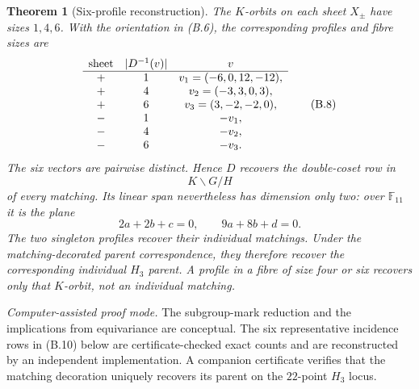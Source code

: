 \documentclass[11pt]{article}
\newtheorem{theorem}{Theorem}[section]
\theoremstyle{definition}
\theoremstyle{remark}
\newcommand{\F}{\mathbb{F}}
\begin{document}
\begin{theorem}[Six-profile reconstruction]
\label{thm:six-profile-reconstruction}
The \(K\)-orbits on each sheet \(X_\pm\) have sizes \(1,4,6\).
With the orientation in (B.6), the corresponding profiles and fibre
sizes are
\[
\begin{array}{c@{\quad}c@{\quad}c}
\text{sheet}& |D^{-1}(v)|&v\\ \hline
+&1&v_1=(-6,0,12,-12),\\
+&4&v_2=(-3,3,0,3),\\
+&6&v_3=(3,-2,-2,0),\\
-&1&-v_1,\\
-&4&-v_2,\\
-&6&-v_3.
\end{array}                                                \tag{B.8}
\]
The six vectors are pairwise distinct.  Hence \(D\) recovers the
double-coset row in
\[
 K\backslash G/H
\]
of every matching.  Its linear span nevertheless has dimension only
two: over \(\F_{11}\) it is the plane
\[
 2a+2b+c=0,\qquad 9a+8b+d=0.                              \tag{B.9}
\]
The two singleton profiles recover their individual matchings.  Under
the matching-decorated parent correspondence, they therefore recover
the corresponding individual \(H_3\) parent.  A profile in a fibre of
size four or six recovers only that \(K\)-orbit, not an individual
matching.
\end{theorem}

\noindent\emph{Computer-assisted proof mode.}
The subgroup-mark reduction and the implications from equivariance are
conceptual.  The six representative incidence rows in (B.10) below are
certificate-checked exact counts and are reconstructed by an independent
implementation.  A companion certificate verifies that the matching
decoration uniquely recovers its parent on the \(22\)-point \(H_3\)
locus.
\end{document}
